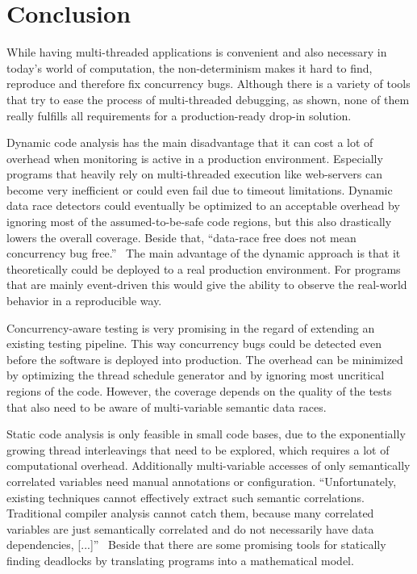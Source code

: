 \documentclass[conference]{IEEEtran}
\begin{document}
\section{Conclusion}
\label{sct:conclusion}

While having multi-threaded applications is convenient and also necessary in today's world of computation, the non-determinism makes it hard to find, reproduce and therefore fix concurrency bugs.
Although there is a variety of tools that try to ease the process of multi-threaded debugging, as shown, none of them really fulfills all requirements for a production-ready drop-in solution.

Dynamic code analysis has the main disadvantage that it can cost a lot of overhead when monitoring is active in a production environment.
Especially programs that heavily rely on multi-threaded execution like web-servers  can become very inefficient or could even fail due to timeout limitations.
Dynamic data race detectors could eventually be optimized to an acceptable overhead by ignoring most of the assumed-to-be-safe code regions, but this also drastically lowers the overall coverage.
Beside that, ``data-race free does not mean concurrency bug free.''~\cite{lu2008mistakes}
The main advantage of the dynamic approach is that it theoretically could be deployed to a real production environment.
For programs that are mainly event-driven this would give the ability to observe the real-world behavior in a reproducible way.

Concurrency-aware testing is very promising in the regard of extending an existing testing pipeline.
This way concurrency bugs could be detected even before the software is deployed into production.
The overhead can be minimized by optimizing the thread schedule generator and by ignoring most uncritical regions of the code.
However, the coverage depends on the quality of the tests that also need to be aware of multi-variable semantic data races.

Static code analysis is only feasible in small code bases, due to the exponentially growing thread interleavings that need to be explored, which requires a lot of computational overhead.
Additionally multi-variable accesses of only semantically correlated variables need manual annotations or configuration.
``Unfortunately, existing techniques cannot effectively extract such semantic correlations. Traditional compiler analysis cannot catch them, because many correlated variables are just semantically correlated and do not necessarily have data dependencies, [...]''~\cite{lu2007muvi}
Beside that there are some promising tools for statically finding deadlocks by translating programs into a mathematical model.
\end{document}
